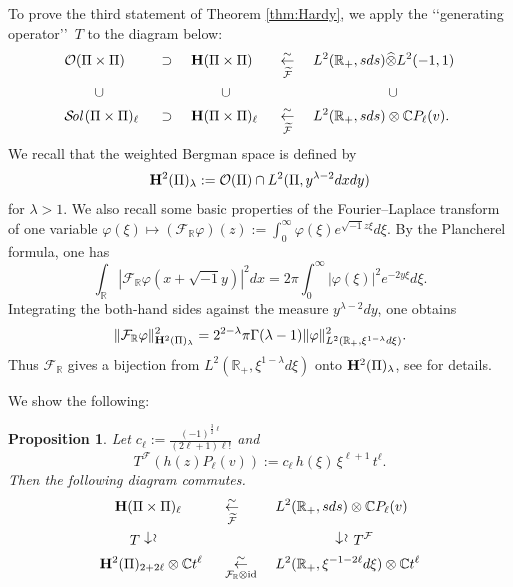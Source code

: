 \documentclass[12pt,leqno]{amsart}
\theoremstyle{plain}
\newtheorem{proposition}[thm]{Proposition}
\theoremstyle{definition}
\newcommand\Sol{{\mathcal {S}}\!{\text{\it{ol}}}\,}
\begin{document}
To prove the third statement of Theorem \ref{thm:Hardy}, 
 we apply the \lq\lq{generating operator}\rq\rq\
 $T$ to 
the diagram below:
\begin{alignat}{5}
&{\mathcal{O}}(\Pi \times \Pi)
&&\,\,\supset\,\,
&&{\bf{H}}(\Pi \times \Pi)
&&\,\,\overset \sim {\underset{\widetilde{\mathcal{F}}}\leftarrow}\,\,
&&L^2({\mathbb{R}}_{+}, s d s) \widehat \otimes L^2(-1,1)
\notag
\\
& \hphantom{MM}\cup
&& 
&& \hphantom{MM}\cup
&&
&&\hphantom{MMMMM}\cup
\label{eqn:FSol}
\\
&\Sol(\Pi \times \Pi)_{\ell}
&&\,\,\supset\,\,
&&{\bf{H}}(\Pi \times \Pi)_{\ell}
&&\,\,\overset \sim {\underset{\widetilde{\mathcal{F}}}\leftarrow}\,\,
&&L^2({\mathbb{R}}_+, s d s) \otimes {\mathbb{C}} P_{\ell}(v).  
\notag
\end{alignat}
We recall
 that the weighted Bergman space is defined by 
\[
  {\bf{H}}^2(\Pi)_{\lambda}:={\mathcal{O}}(\Pi) \cap L^2(\Pi, y^{\lambda-2} d x d y) 
\]
for $\lambda >1$.  
We also recall some basic properties
 of the Fourier--Laplace transform
 of one variable 
 $\varphi(\xi) \mapsto ({\mathcal{F}}_{\mathbb{R}} \varphi)(z):=\int_{0}^{\infty}\varphi(\xi)e^{\sqrt{-1} z \xi}d \xi$.  
By the Plancherel formula, 
 one has 
\[
  \int_{\mathbb{R}}|{\mathcal{F}}_{\mathbb{R}} \varphi(x+\sqrt{-1}y)|^2 d x
  =
  2 \pi \int_0^{\infty}|\varphi(\xi)|^2e^{-2 y \xi}d \xi.  
\]
Integrating the both-hand sides against the measure
 $y^{\lambda-2}d y$, 
one obtains 
\begin{equation}
\label{eqn:FBlmd}
  \|{\mathcal{F}}_{\mathbb{R}} \varphi\|_{{\bf{H}}^2(\Pi)_{\lambda}}^2
=2^{2-\lambda}\pi \Gamma(\lambda-1)\|\varphi\|_{L^2({\mathbb{R}}_+, \xi^{1-\lambda}d \xi)}^2. 
\end{equation}
Thus ${\mathcal{F}}_{\mathbb{R}}$ gives
 a bijection from $L^2({\mathbb{R}}_+, \xi^{1-\lambda} d \xi)$
 onto ${\bf{H}}^2(\Pi)_{\lambda}$, 
 see \cite[Thm.\ XIII.1.1]{xFaKo94} for details.  

We show the following:

\begin{proposition}
\label{prop:IHES230326}
Let 
 $c_{\ell}:=\frac{(-1)^{\frac 3 2 {\ell}}}{(2\ell+1) \ell !}$ and 
\[
  T^{\mathcal{F}}(h(z) P_{\ell}(v))
  :=
  c_{\ell}\, h(\xi)\, \xi^{\ell+1}\, t^{\ell}.  
\]
Then the following diagram commutes.  
\begin{alignat*}{3}
&\hphantom{M}{\bf{H}}(\Pi \times \Pi)_{\ell}
&&\,\,\underset{\widetilde {\mathcal{F}}}{\overset \sim \leftarrow}\,\,
&&L^2({\mathbb{R}}_+, s d s) \otimes {\mathbb{C}}P_{\ell}(v)
\\
& \hphantom{MM}T\,\, \rotatebox[origin=c]{270}{$\overset \sim \rightarrow$}
&&
&&\hphantom{MMMM}\rotatebox[origin=c]{270}{$\overset \sim \rightarrow$}\,\,
T^{\mathcal{F}}
\\
&
{\bf{H}}^2(\Pi)_{2+2\ell}
\otimes
{\mathbb{C}} t^{\ell}
&&\,\,\underset{{\mathcal{F}}_{\mathbb{R}} \otimes \operatorname{id}}{\overset \sim \leftarrow}\,\,
&&L^2({\mathbb{R}}_+, \xi^{-1-2\ell} d \xi) \otimes {\mathbb{C}} t^{\ell}
\end{alignat*}
\end{proposition}
\end{document}
